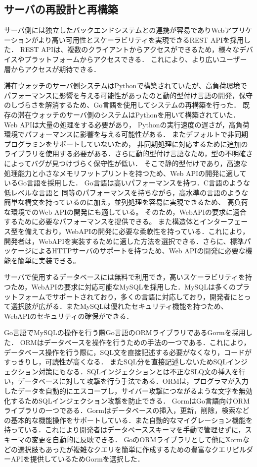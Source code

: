 



\subsection{サーバの再設計と再構築}\label{4.1.1}
サーバ側には独立したバックエンドシステムとの連携が容易でありWebアプリケーションがより高い可用性とスケーラビリティを実現できるREST APIを採用した．
REST APIは、複数のクライアントからアクセスができるため，様々なデバイスやプラットフォームからアクセスできる．
これにより、より広いユーザー層からアクセスが期待できる．


滞在ウォッチのサーバ側システムはPythonで構築されていたが、高負荷環境でパフォーマンスに影響を与える可能性があったのと動的型付け言語の開発，保守のしづらさを解消するため、Go言語を使用してシステムの再構築を行った．
既存の滞在ウォッチのサーバ側のシステムはPythonを用いて構築されていた．Web APIは大量の処理をする必要があり，
Pythonの実行速度の遅さが，高負荷環境でパフォーマンスに影響を与える可能性がある．
またデフォルトで非同期プログラミンをサポートしていないため，
非同期処理に対応するために追加のライブラリを使用する必要がある．さらに動的型付け言語なため，型の不明確さによってバグが見つけづらく保守性が低い．
そこで静的型付けであり，高速な処理能力と小さなメモリフットプリントを持つため、Web APIの開発に適しているGo言語を採用した．
Go言語は高いパフォーマンスを持つ．C言語のような低レベルな言語と
同等のパフォーマンスを持ちながら，高水準の言語のような簡単な構文を持っているのに加え，並列処理を容易に実現できるため、
高負荷な環境でのWeb APIの開発にも適している。
そのため，WebAPIの要求に適合するために必要なパフォーマンスを提供できる。
また構造体とインターフェース型を備えており，WebAPIの開発に必要な柔軟性を持っている．これにより，開発者は，WebAPIを実装するために適した方法を選択できる．さらに、標準パッケージによるHTTPサーバのサポートを持つため、Web APIの開発に必要な機能を簡単に実装できる。

サーバで使用するデータベースには無料で利用でき，高いスケーラビリティを持つため，WebAPIの要求に対応可能なMySQLを採用した．MySQLは多くのプラットフォームでサポートされており，多くの言語に対応しており，開発者にとって選択肢が広がる．またMySQLは優れたセキュリティ機能を持つため、WebAPIのセキュリティの確保ができる．

Go言語でMySQLの操作を行う際Go言語のORMライブラリであるGormを採用した．
ORMはデータベースを操作を行うための手法の一つである．これにより，データベース操作を行う際に，SQL文を直接記述する必要がなくなり，コードがすっきりし，可読性が高くなる．
またSQL分を直接記述しないためSQLインジェクション対策にもなる．SQLインジェクションとは不正なSLQ文の挿入を行い，データベースに対して攻撃を行う手法である．ORMは，プログラマが入力したデータを自動的にエスコープし，サイバー攻撃につながるような文字を無効化するためSQLインジェクション攻撃を防止できる．
GormはGo言語向けORMライブラリの一つである．Gormはデータベースの挿入，更新，削除，検索などの基本的な機能操作をサポートしている．また自動的なマイグレーション機能を持っている．これにより開発者はデータベーススキーマを手動で管理せずに，スキーマの変更を自動的に反映できる．
GoのORMライブラリとして他にXormなどの選択肢もあったが複雑なクエリを簡単に作成するための豊富なクエリビルダーAPIを提供しているためGormを選択した．


